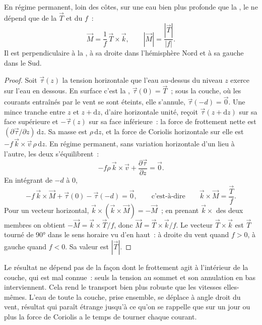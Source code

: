 \begin{theorem}\label{thm:b1:ocean-circulation:ekman}
En régime permanent, loin des côtes, sur une eau bien plus profonde que la , le
 ne dépend que de la  $\vec T$ et du
 $f$~:
\[
  \vec M = \frac{1}{f}\,\vec T\times\vec k,
  \qquad |\vec M| = \frac{|\vec T|}{|f|}.
\]
Il est perpendiculaire à la , à sa droite dans l'hémisphère Nord
et à sa gauche dans le Sud.
\end{theorem}

\begin{proof}
Soit $\vec\tau(z)$ la tension horizontale que l'eau au-dessus du niveau $z$
exerce sur l'eau en dessous. En surface c'est la , $\vec\tau(0) =
\vec T$~; sous la couche, où les courants entraînés par le vent se sont éteints, elle
s'annule, $\vec\tau(-d) = \vec 0$. Une mince tranche entre $z$ et $z + \mathrm dz$,
d'aire horizontale unité, reçoit $\vec\tau(z + \mathrm dz)$ sur sa face supérieure et
$-\vec\tau(z)$ sur sa face inférieure~: la force de frottement nette est $(\partial\vec
\tau/\partial z)\,\mathrm dz$. Sa masse est $\rho\,\mathrm dz$, et la force de
Coriolis horizontale sur elle est $-f\,\vec k\times\vec v\,\rho\,\mathrm dz$. En régime
permanent, sans variation horizontale d'un lieu à l'autre, les deux s'équilibrent~:
\[
  -f\rho\,\vec k\times\vec v + \frac{\partial\vec\tau}{\partial z} = \vec 0 .
\]
En intégrant de $-d$ à $0$,
\[
  -f\,\vec k\times\vec M + \vec\tau(0) - \vec\tau(-d) = \vec 0,
  \qquad\text{c'est-à-dire}\qquad \vec k\times\vec M = \frac{\vec T}{f}.
\]
Pour un vecteur horizontal, $\vec k\times(\vec k\times\vec M) = -\vec M$~; en prenant
$\vec k\times$ des deux membres on obtient $-\vec M = \vec k\times\vec T/f$, donc $\vec M =
\vec T\times\vec k/f$. Le vecteur $\vec T\times\vec k$ est $\vec T$ tourné de
\ang{90} dans le sens horaire vu d'en haut~: à droite du vent quand $f > 0$, à
gauche quand $f < 0$. Sa valeur est $|\vec T|$.
\end{proof}

Le résultat ne dépend pas de la façon dont le frottement agit à l'intérieur de la couche, qui est
mal connue~: seuls la tension au sommet et son annulation en bas interviennent.
Cela rend le transport bien plus robuste que les vitesses elles-mêmes. L'eau
de toute la couche, prise ensemble, se déplace à angle droit du vent, résultat qui
paraît étrange jusqu'à ce qu'on se rappelle que sur un jour ou plus la force de Coriolis a
le temps de tourner chaque courant.

